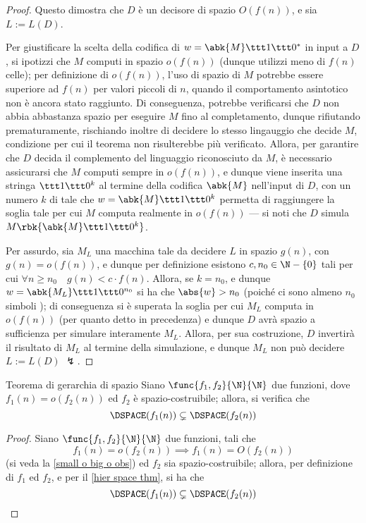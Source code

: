 \documentclass[a4paper, 12pt]{report}
\begin{document}
\begin{proof}
        Questo dimostra che $D$ è un decisore di spazio $O(f(n))$, e sia $L := L(D)$.

        Per giustificare la scelta della codifica di $w = \abk{M} \ttt 1 \ttt 0 ^*$ in input a $D$, si ipotizzi che $M$ computi in spazio $o(f(n))$ (dunque utilizzi meno di $f(n)$ celle); per definizione di $o(f(n))$, l'uso di spazio di $M$ potrebbe essere superiore ad $f(n)$ per valori piccoli di $n$, quando il comportamento asintotico non è ancora stato raggiunto. Di conseguenza, potrebbe verificarsi che $D$ non abbia abbastanza spazio per eseguire $M$ fino al completamento, dunque rifiutando prematuramente, rischiando inoltre di decidere lo stesso lingauggio che decide $M$, condizione per cui il teorema non risulterebbe più verificato. Allora, per garantire che $D$ decida il complemento del linguaggio riconosciuto da $M$, è necessario assicurarsi che $M$ computi sempre in $o(f(n))$, e dunque viene inserita una stringa $\ttt 1 \ttt 0^k$ al termine della codifica $\abk{M}$ nell'input di $D$, con un numero $k$ di  tale che $w = \abk{M} \ttt 1 \ttt 0 ^k$ permetta di raggiungere la soglia tale per cui $M$ computa realmente in $o(f(n))$ --- si noti che $D$ simula $M\rbk{\abk{M} \ttt 1 \ttt 0^k}$.

        Per assurdo, sia $M_L$ una macchina tale da decidere $L$ in spazio $g(n)$, con $g(n) = o(f(n))$, e dunque per definizione esistono $c, n_0 \in \N - \{0 \}$ tali per cui $\forall n \ge n_0 \quad g(n) < c \cdot f(n)$. Allora, se $k = n_0$, e dunque $w = \abk{M_L}\ttt 1 \ttt 0^{n_0}$ si ha che $\abs{w} > n_0$ (poiché ci sono almeno $n_0$ simboli ); di conseguenza si è superata la soglia per cui $M_L$ computa in $o(f(n))$ (per quanto detto in precedenza) e dunque $D$ avrà spazio a sufficienza per simulare interamente $M_L$. Allora, per sua costruzione, $D$ invertirà il risultato di $M_L$ al termine della simulazione, e dunque $M_L$ non può decidere $L := L(D)$ $\lightning$.
    \end{proof}

    \begin{framedcor}[label={hier space thm cor}]{Teorema di gerarchia di spazio}
        Siano $\func{f_1, f_2}{\N}{\N}$ due funzioni, dove $f_1(n) = o(f_2(n))$ ed $f_2$ è spazio-costruibile; allora, si verifica che $$\DSPACE(f_1(n)) \subsetneq \DSPACE(f_2(n))$$
    \end{framedcor}

    \begin{proof}
        Siano $\func{f_1, f_2}{\N}{\N}$ due funzioni, tali che $$f_1(n) = o(f_2(n)) \implies f_1(n) = O(f_2(n))$$ (si veda la \cref{small o big o obs}) ed $f_2$ sia spazio-costruibile; allora, per definizione di $f_1$ ed $f_2$, e per il \cref{hier space thm}, si ha che $$\DSPACE(f_1(n)) \subsetneq \DSPACE(f_2(n))$$
    \end{proof}
\end{document}
